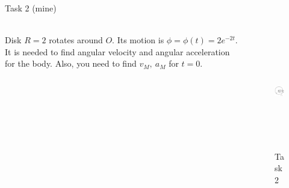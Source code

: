 \documentclass[aspectratio=169,xcolor=table,10pt, notes=hide]{beamer}
\begin{document}
\begin{frame}[t]{Task 2 (mine)}
    \framesubtitle{}
    \begin{columns}[c,onlytextwidth]
        \begin{column}{0.59\textwidth}
            Disk $R = 2$ rotates around $O$. Its motion is $\phi = \phi(t) = 2e^{-2t}$. It is needed to find angular velocity and angular acceleration for the body. Also, you need to find $v_M,\ a_M$ for $t=0$.
        \end{column}
        \begin{column}{0.39\textwidth}
            \begin{figure}[H]
                \centering\includegraphics[height=5cm,width=1\textwidth,keepaspectratio]{image8.png}
                \caption*{Task 2}
                \label{fig:image8.png}
            \end{figure}
        \end{column}
    \end{columns}
\end{frame}
\end{document}
